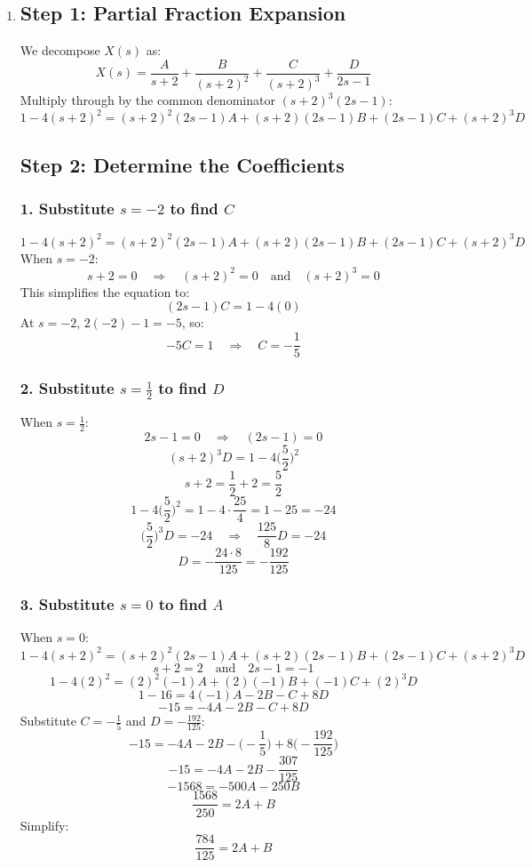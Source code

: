 \documentclass[12pt]{article}
\begin{document}
\begin{enumerate}
\begin{enumerate}
  \item \subsection*{Step 1: Partial Fraction Expansion}
  We decompose \( X(s) \) as:
  \[
  X(s) = \frac{A}{s + 2} + \frac{B}{(s + 2)^2} + \frac{C}{(s + 2)^3} + \frac{D}{2s - 1}
  \]
  Multiply through by the common denominator \( (s + 2)^3 (2s - 1) \):
  \[
  1 - 4 (s + 2)^2 = (s + 2)^2 (2s - 1) A + (s + 2) (2s - 1) B + (2s - 1) C + (s + 2)^3 D
  \]

  \subsection*{Step 2: Determine the Coefficients}
  \subsubsection*{1. Substitute \( s = -2 \) to find \( C \)}
  \[
  1 - 4(s + 2)^2 = (s + 2)^2 (2s - 1) A + (s + 2) (2s - 1) B + (2s - 1) C + (s + 2)^3 D
  \]
  When \( s = -2 \):
  \[
  s + 2 = 0 \quad \Rightarrow \quad (s + 2)^2 = 0 \quad \text{and} \quad (s + 2)^3 = 0
  \]
  This simplifies the equation to:
  \[
  (2s - 1) C = 1 - 4(0)
  \]
  At \( s = -2 \), \( 2(-2) - 1 = -5 \), so:
  \[
  -5 C = 1 \quad \Rightarrow \quad C = -\frac{1}{5}
  \]

  \subsubsection*{2. Substitute \( s = \frac{1}{2} \) to find \( D \)}
  When \( s = \frac{1}{2} \):
  \[
  2s - 1 = 0 \quad \Rightarrow \quad (2s - 1) = 0
  \]
  \[
  (s + 2)^3 D = 1 - 4 \bigg( \frac{5}{2} \bigg)^2
  \]
  \[
  s + 2 = \frac{1}{2} + 2 = \frac{5}{2}
  \]
  \[
  1 - 4 \bigg( \frac{5}{2} \bigg)^2 = 1 - 4 \cdot \frac{25}{4} = 1 - 25 = -24
  \]
  \[
  \bigg( \frac{5}{2} \bigg)^3 D = -24 \quad \Rightarrow \quad \frac{125}{8} D = -24
  \]
  \[
  D = -\frac{24 \cdot 8}{125} = -\frac{192}{125}
  \]

  \subsubsection*{3. Substitute \( s = 0 \) to find \( A \)}
  When \( s = 0 \):
  \[
  1 - 4 (s + 2)^2 = (s + 2)^2 (2s - 1) A + (s + 2) (2s - 1) B + (2s - 1) C + (s + 2)^3 D
  \]
  \[
  s + 2 = 2 \quad \text{and} \quad 2s - 1 = -1
  \]
  \[
  1 - 4(2)^2 = (2)^2 (-1) A + (2)(-1) B + (-1) C + (2)^3 D
  \]
  \[
  1 - 16 = 4(-1) A - 2B - C + 8D
  \]
  \[
  -15 = -4A - 2B - C + 8D
  \]
  Substitute \( C = -\frac{1}{5} \) and \( D = -\frac{192}{125} \):
  \[
  -15 = -4A - 2B - \bigg( -\frac{1}{5} \bigg) + 8 \bigg( -\frac{192}{125} \bigg)
  \]
  \[
  -15 = -4A - 2B - \frac{307}{125}
  \]
  \[
  -1568 = -500A - 250B
  \]
  \[
  \frac{1568}{250} = 2A + B
  \]
  Simplify:
  \[
  \frac{784}{125} = 2A + B
  \]


\end{enumerate}
\end{enumerate}
\end{document}
